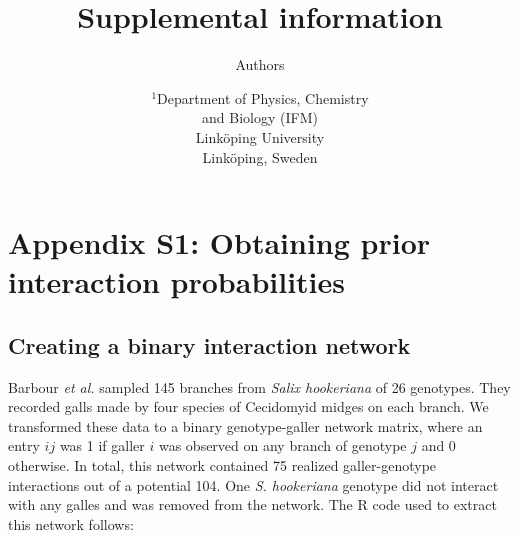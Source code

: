 \documentclass[12pt]{article}
\title{Supplemental information}
\author{Authors}
\date{\small$^1$Department of Physics, Chemistry\\ 
and Biology (IFM)\\ 
Link\"{o}ping University\\
Link\"{o}ping, Sweden\\
 }
\begin{document}
 
\maketitle 
\raggedright
\setlength{\parindent}{15pt} 
\clearpage

\section*{Appendix S1: Obtaining prior interaction probabilities}

    \subsection*{Creating a binary interaction network}

      Barbour \emph{et al.} sampled 145 branches from 
      \emph{Salix hookeriana} of 26 genotypes. They recorded galls 
      made by four species of Cecidomyid midges on each branch. We 
      transformed these data to a binary genotype-galler network 
      matrix, where an entry $ij$ was 1 if galler $i$ was observed 
      on any branch of genotype $j$ and 0 otherwise. In total, this 
      network contained 75 realized galler-genotype interactions 
      out of a potential 104. One \emph{S. hookeriana} genotype did
      not interact with any galles and was removed from the network.
      The R code used to extract this 
      network follows:
\end{document}
